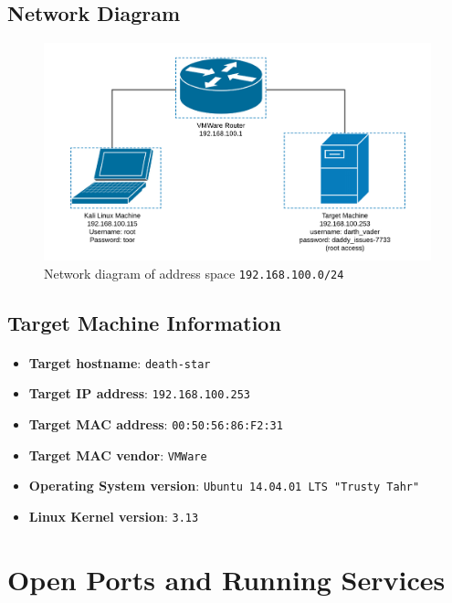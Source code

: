 \documentclass{article}
\begin{document}
\subsection{Network Diagram}
\label{subsec:network_diagram}
\begin{figure}[h!]
	\includegraphics[width=\linewidth]{resources/network-diagram-new.png}
	\caption{Network diagram of address space \texttt{192.168.100.0/24}}
	\label{fig:network_diagram}
\end{figure}

\subsection{Target Machine Information}
\label{subsec:target_info}
\paragraph{}
\begin{itemize}
	\item \textbf{Target hostname}: \texttt{death-star}
	\item \textbf{Target IP address}: \texttt{192.168.100.253}
	\item \textbf{Target MAC address}: \texttt{00:50:56:86:F2:31}
	\item \textbf{Target MAC vendor}: \texttt{VMWare}
	\item \textbf{Operating System version}: \texttt{Ubuntu 14.04.01 LTS "Trusty Tahr"}
	\item \textbf{Linux Kernel version}: \texttt{3.13}
\end{itemize}

\newpage

\section{Open Ports and Running Services}
\label{sec:services}
\end{document}

